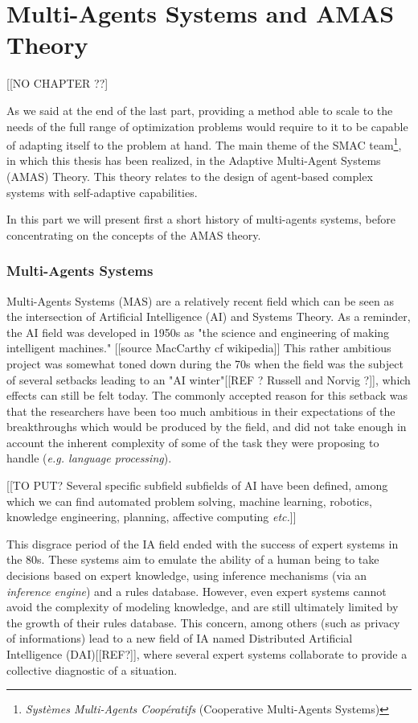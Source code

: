 \part{Multi-Agents Systems and AMAS Theory}

[[NO CHAPTER ??]

As we said at the end of the last part, providing a method able to scale to the needs of the full range of optimization problems would require to it to be capable of adapting itself to the problem at hand.
The main theme of the SMAC team\footnote{\emph{Systèmes Multi-Agents Coopératifs} (Cooperative Multi-Agents Systems)}, in which this thesis has been realized, in the Adaptive Multi-Agent Systems (AMAS) Theory. This theory relates to the design of agent-based complex systems with self-adaptive capabilities.

In this part we will present first a short history of multi-agents systems, before concentrating on the concepts of the AMAS theory.

\section{Multi-Agents Systems}

Multi-Agents Systems (MAS) are a relatively recent field which can be seen as the intersection of Artificial Intelligence (AI) and Systems Theory. As a reminder, the AI field was developed in 1950s as "the science and engineering of making intelligent machines." [[source MacCarthy cf wikipedia]] This rather ambitious project was somewhat toned down during the 70s when the field was the subject of several setbacks leading to an "AI winter"[[REF ? Russell and Norvig ?]], which effects can still be felt today. The commonly accepted reason for this setback was that the researchers have been too much ambitious in their expectations of the breakthroughs which would be produced by the field, and did not take enough in account the inherent complexity of some of the task they were proposing to handle (\emph{e.g. language processing}).

[[TO PUT? Several specific subfield subfields of AI have been defined, among which we can find automated problem solving, machine learning, robotics, knowledge engineering, planning, affective computing \emph{etc.}]]

This disgrace period of the IA field ended with the success of expert systems in the 80s. These systems aim to emulate the ability of a human being to take decisions based on expert knowledge, using inference mechanisms (via an \emph{inference engine}) and a rules database.
However, even expert systems cannot avoid the complexity of modeling knowledge, and are still ultimately limited by the growth of their rules database. This concern, among others (such as privacy of informations) lead to a new field of IA named Distributed Artificial Intelligence (DAI)[[REF?]], where several expert systems collaborate to provide a collective diagnostic of a situation.

